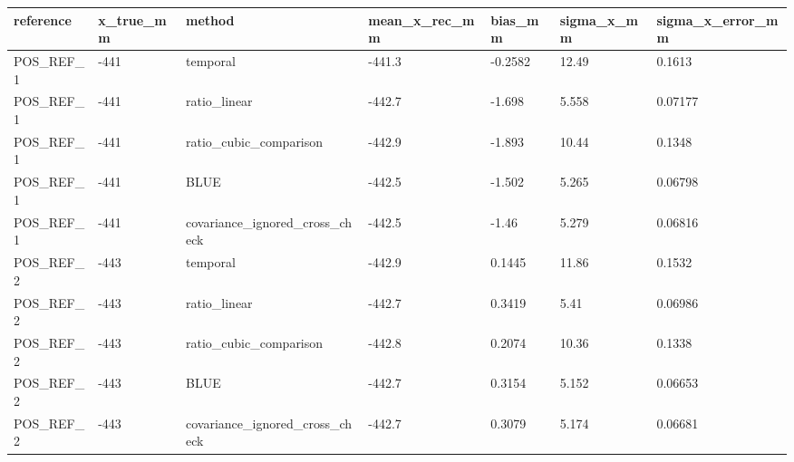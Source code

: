 \begin{tabular}{lllllll}
\hline
reference & x\_true\_mm & method & mean\_x\_rec\_mm & bias\_mm & sigma\_x\_mm & sigma\_x\_error\_mm \\
\hline
POS\_REF\_1 & -441 & temporal & -441.3 & -0.2582 & 12.49 & 0.1613 \\
POS\_REF\_1 & -441 & ratio\_linear & -442.7 & -1.698 & 5.558 & 0.07177 \\
POS\_REF\_1 & -441 & ratio\_cubic\_comparison & -442.9 & -1.893 & 10.44 & 0.1348 \\
POS\_REF\_1 & -441 & BLUE & -442.5 & -1.502 & 5.265 & 0.06798 \\
POS\_REF\_1 & -441 & covariance\_ignored\_cross\_check & -442.5 & -1.46 & 5.279 & 0.06816 \\
POS\_REF\_2 & -443 & temporal & -442.9 & 0.1445 & 11.86 & 0.1532 \\
POS\_REF\_2 & -443 & ratio\_linear & -442.7 & 0.3419 & 5.41 & 0.06986 \\
POS\_REF\_2 & -443 & ratio\_cubic\_comparison & -442.8 & 0.2074 & 10.36 & 0.1338 \\
POS\_REF\_2 & -443 & BLUE & -442.7 & 0.3154 & 5.152 & 0.06653 \\
POS\_REF\_2 & -443 & covariance\_ignored\_cross\_check & -442.7 & 0.3079 & 5.174 & 0.06681 \\
\hline
\end{tabular}
